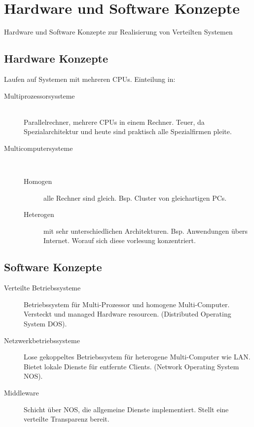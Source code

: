 \chapter{Hardware und Software Konzepte}

Hardware und Software Konzepte zur Realisierung von Verteilten Systemen\cite[p.~25]{VS1}

\section{Hardware Konzepte}

Laufen auf Systemen mit mehreren CPUs. Einteilung in:
\begin{description}
	\item[Multiprozessorsyssteme] \hfill \\
		Parallelrechner, mehrere CPUs in einem Rechner. Teuer, da Spezialarchitektur und heute sind praktisch alle Spezialfirmen pleite.
	\item[Multicomputersysteme] \hfill \\
		\begin{description}
			\item[Homogen] alle Rechner sind gleich. Bsp. Cluster von gleichartigen PCs.
			\item[Heterogen] mit sehr unterschiedlichen Architekturen. Bsp. Anwendungen übers Internet. Worauf sich diese vorlesung konzentriert.
		\end{description}
\end{description}

\section{Software Konzepte}

\begin{description}
	\item[Verteilte Betriebssysteme] Betriebssystem für Multi-Prozessor und homogene Multi-Computer. Versteckt und managed Hardware resourcen. (Distributed Operating System DOS).
	\item[Netzwerkbetriebssysteme] Lose gekoppeltes Betriebssystem für heterogene Multi-Computer wie LAN. Bietet lokale Dienste für entfernte Clients. (Network Operating System NOS).
	\item[Middleware] Schicht über NOS, die allgemeine Dienste implementiert. Stellt eine verteilte Transparenz bereit.
\end{description}
